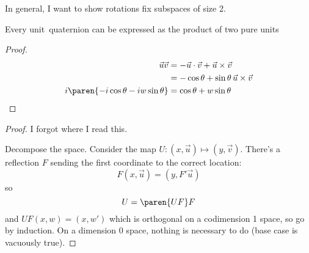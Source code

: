 \documentclass{scrartcl}
\begin{document}
\begin{multicols*}{2}
  In general, I want to show rotations fix subspaces of size 2.

  \begin{theorem}
    Every unit~quaternion can be expressed as the product of two pure units
  \end{theorem}
  \begin{proof}
    \begin{align*}
      \vec u \vec v &= -\vec u \cdot \vec v + \vec u \times \vec v \\
                    &= -\cos\theta + \sin\theta \,\vec u\times\vec v \\
      i \paren{-i \cos \theta  - iw\sin\theta} &= \cos\theta + w\sin\theta
    \end{align*}
  \end{proof}

  \begin{theorem}
  \end{theorem}
  \begin{proof}
    I forgot where I read this.

    Decompose the space. Consider the map \(U:(x,\vec u) \mapsto (y,\vec v)\). There's a reflection \(F\) sending the first coordinate to the correct location:
    \[
      F(x,\vec u) = (y, F' \vec u)
    \]
    so
    \[
      U = \paren{UF} F
    \]
    and \(UF(x,w) = (x,w')\) which is orthogonal on a codimension 1 space, so go by induction. On a dimension 0 space, nothing is necessary to do (base case is vacuously true).
  \end{proof}


\end{multicols*}
\end{document}
